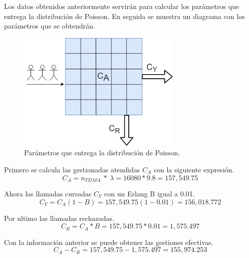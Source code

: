 \documentclass[11pt,letterpaper]{article}
\begin{document}
\newpage
Los datos obtenidos anteriormente servirán para calcular los parámetros que entrega 
la distribución de Poisson. En seguida se muestra un diagrama con los parámetros que se 
obtendrán.

\begin{figure}[ht]
    \centering
    \includegraphics[width=0.7\textwidth]{imagenes/pos.png}
    \caption{Parámetros que entrega la distribución de Poisson.}
\end{figure}

Primero se calcula las gestionadas atendidas $C_{A}$ con la siguiente expresión.
\begin{equation}
    C_A=n_{TDMA} \ * \ \lambda = 16080 * 9.8= 157,549.75
\end{equation}

Ahora las llamadas cursadas $C_Y$ con un Erlang B igual a 0.01.
\begin{equation}
    C_Y=C_A(1-B)=157,549.75(1-0.01)=156,018.772
\end{equation}

Por ultimo las llamadas rechazadas.
\begin{equation}
    C_R=C_A*B=157,549.75*0.01=1,575.497
\end{equation}

Con la información anterior se puede obtener las gestiones efectivas.
\begin{equation}
    C_A-C_R=157,549.75-1,575.497=155,974.253
\end{equation}
\end{document}
